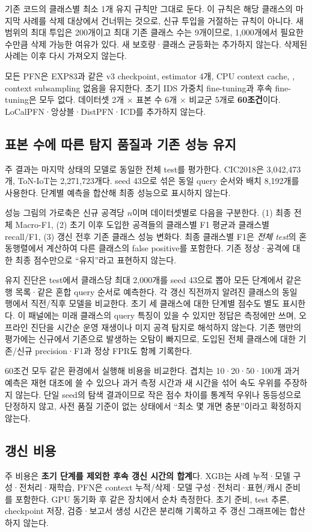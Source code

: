 기존 코드의 클래스별 최소 1개 유지 규칙만 그대로 둔다. 이 규칙은 해당 클래스의 마지막 사례를 삭제 대상에서 건너뛰는 것으로, 신규 투입을 거절하는 규칙이 아니다. 새 범위의 최대 투입은 200개이고 최대 기존 클래스 수는 9개이므로, 1,000개에서 필요한 수만큼 삭제 가능한 여유가 있다. 새 보호량·클래스 균등화는 추가하지 않는다. 삭제된 사례는 이후 다시 가져오지 않는다.

모든 PFN은 EXP83과 같은 v3 checkpoint, estimator 4개, CPU context cache, , context subsampling 없음을 유지한다. 초기 IDS 가중치 fine-tuning과 후속 fine-tuning은 모두 없다. 데이터셋 2개 $\times$ 표본 수 6개 $\times$ 비교군 5개로 \textbf{60조건}이다. LoCalPFN·앙상블·DistPFN·ICD를 추가하지 않는다.

\subsection{표본 수에 따른 탐지 품질과 기존 성능 유지}
주 결과는 마지막 상태의 모델로 동일한 전체 test를 평가한다. CIC2018은 3,042,473개, ToN-IoT는 2,271,723개다. seed 43으로 섞은 동일 query 순서와 배치 8,192개를 사용한다. 단계별 예측을 합산해 최종 성능으로 표시하지 않는다.

성능 그림의 가로축은 신규 공격당 $n$이며 데이터셋별로 다음을 구분한다. (1) 최종 전체 Macro-F1, (2) 초기 이후 도입한 공격들의 클래스별 F1 평균과 클래스별 recall/F1, (3) 갱신 전후 기존 클래스 성능 변화다. 최종 클래스별 F1은 \emph{전체 test}의 혼동행렬에서 계산하여 다른 클래스의 false positive를 포함한다. 기존 정상·공격에 대한 최종 점수만으로 ``유지''라고 표현하지 않는다.

유지 진단은 test에서 클래스당 최대 2,000개를 seed 43으로 뽑아 모든 단계에서 같은 행 목록·같은 혼합 query 순서로 예측한다. 각 갱신 직전까지 알려진 클래스의 동일 행에서 직전/직후 모델을 비교한다. 초기 세 클래스에 대한 단계별 점수도 별도 표시한다. 이 패널에는 미래 클래스의 query 특징이 있을 수 있지만 정답은 측정에만 쓰며, 오프라인 진단을 시간순 운영 재생이나 미지 공격 탐지로 해석하지 않는다. 기존 행만의 평가에는 신규에서 기존으로 발생하는 오탐이 빠지므로, 도입된 전체 클래스에 대한 기존/신규 precision·F1과 정상 FPR도 함께 기록한다.

60조건 모두 같은 환경에서 실행해 비용을 비교한다. 겹치는 10·20·50·100개 과거 예측은 재현 대조에 쓸 수 있으나 과거 측정 시간과 새 시간을 섞어 속도 우위를 주장하지 않는다. 단일 seed의 탐색 결과이므로 작은 점수 차이를 통계적 우위나 동등성으로 단정하지 않고, 사전 품질 기준이 없는 상태에서 ``최소 몇 개면 충분''이라고 확정하지 않는다.

\subsection{갱신 비용}
주 비용은 \textbf{초기 단계를 제외한 후속 갱신 시간의 합계}다. XGB는 사례 누적·모델 구성·전처리·재학습, PFN은 context 누적/삭제·모델 구성·전처리·표현/캐시 준비를 포함한다. GPU 동기화 후 같은 장치에서 순차 측정한다. 초기 준비, test 추론, checkpoint 저장, 검증·보고서 생성 시간은 분리해 기록하고 주 갱신 그래프에는 합산하지 않는다.

